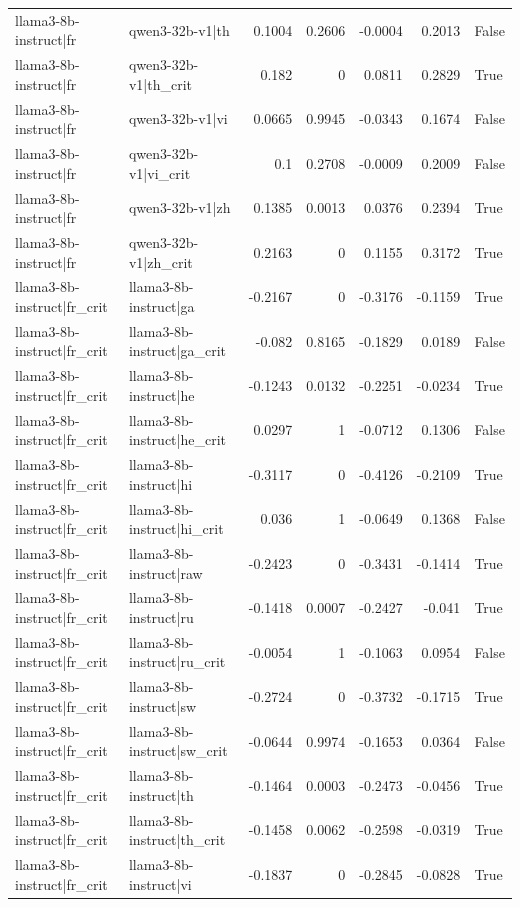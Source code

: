 \begin{table}
\begin{tabular}{l l r r r r l}
llama3-8b-instruct|fr & qwen3-32b-v1|th & 0.1004 & 0.2606 & -0.0004 & 0.2013 & False \\
llama3-8b-instruct|fr & qwen3-32b-v1|th_crit & 0.182 & 0 & 0.0811 & 0.2829 & True \\
llama3-8b-instruct|fr & qwen3-32b-v1|vi & 0.0665 & 0.9945 & -0.0343 & 0.1674 & False \\
llama3-8b-instruct|fr & qwen3-32b-v1|vi_crit & 0.1 & 0.2708 & -0.0009 & 0.2009 & False \\
llama3-8b-instruct|fr & qwen3-32b-v1|zh & 0.1385 & 0.0013 & 0.0376 & 0.2394 & True \\
llama3-8b-instruct|fr & qwen3-32b-v1|zh_crit & 0.2163 & 0 & 0.1155 & 0.3172 & True \\
llama3-8b-instruct|fr_crit & llama3-8b-instruct|ga & -0.2167 & 0 & -0.3176 & -0.1159 & True \\
llama3-8b-instruct|fr_crit & llama3-8b-instruct|ga_crit & -0.082 & 0.8165 & -0.1829 & 0.0189 & False \\
llama3-8b-instruct|fr_crit & llama3-8b-instruct|he & -0.1243 & 0.0132 & -0.2251 & -0.0234 & True \\
llama3-8b-instruct|fr_crit & llama3-8b-instruct|he_crit & 0.0297 & 1 & -0.0712 & 0.1306 & False \\
llama3-8b-instruct|fr_crit & llama3-8b-instruct|hi & -0.3117 & 0 & -0.4126 & -0.2109 & True \\
llama3-8b-instruct|fr_crit & llama3-8b-instruct|hi_crit & 0.036 & 1 & -0.0649 & 0.1368 & False \\
llama3-8b-instruct|fr_crit & llama3-8b-instruct|raw & -0.2423 & 0 & -0.3431 & -0.1414 & True \\
llama3-8b-instruct|fr_crit & llama3-8b-instruct|ru & -0.1418 & 0.0007 & -0.2427 & -0.041 & True \\
llama3-8b-instruct|fr_crit & llama3-8b-instruct|ru_crit & -0.0054 & 1 & -0.1063 & 0.0954 & False \\
llama3-8b-instruct|fr_crit & llama3-8b-instruct|sw & -0.2724 & 0 & -0.3732 & -0.1715 & True \\
llama3-8b-instruct|fr_crit & llama3-8b-instruct|sw_crit & -0.0644 & 0.9974 & -0.1653 & 0.0364 & False \\
llama3-8b-instruct|fr_crit & llama3-8b-instruct|th & -0.1464 & 0.0003 & -0.2473 & -0.0456 & True \\
llama3-8b-instruct|fr_crit & llama3-8b-instruct|th_crit & -0.1458 & 0.0062 & -0.2598 & -0.0319 & True \\
llama3-8b-instruct|fr_crit & llama3-8b-instruct|vi & -0.1837 & 0 & -0.2845 & -0.0828 & True \\

\end{tabular}
\end{table}
